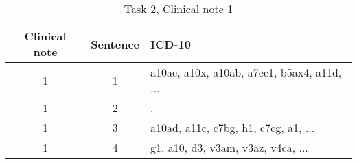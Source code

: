 \begin{table}[htbp] \footnotesize \center
\caption{Task 2, Clinical note 1 \label{tab:t2c1}}
\begin{tabularx}{\textwidth}{c c X}
    \toprule
    Clinical note & Sentence & ICD-10 \\
    \midrule
	 1 & 1 & a10ae, a10x, a10ab, a7ec1, b5ax4, a11d, ... \\
	 1 & 2 & . \\
	 1 & 3 & a10ad, a11c, c7bg, h1, c7cg, a1, ... \\
	 1 & 4 & g1, a10, d3, v3am, v3az, v4ca, ... \\
	\bottomrule
\end{tabularx}
\end{table}